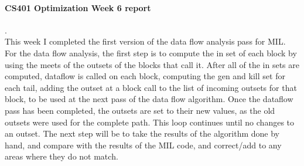\documentclass[14pt]{article}
\author{Joel Anna<annajoel@pdx.edu>}
\begin{document}
\paragraph{CS401 Optimization Week 6 report} 
.\\
This week I completed the first version of the data flow analysis pass for MIL.
For the data flow analysis, the first step is to compute the in set of each block by using the meets of the outsets of the blocks that call it. After all of the in sets are computed, dataflow is called on each block, computing the gen and kill set for each tail, adding the outset at a block call to the list of incoming outsets for that block, to be used at the next pass of the data flow algorithm. Once the dataflow pass has been completed, the outsets are set to their new values, as the old outsets were used for the complete path.
This loop continues until no changes to an outset.
The next step will be to take the results of the algorithm done by hand, and compare with the results of the MIL code, and correct/add to any areas where they do not match.
\end{document}

